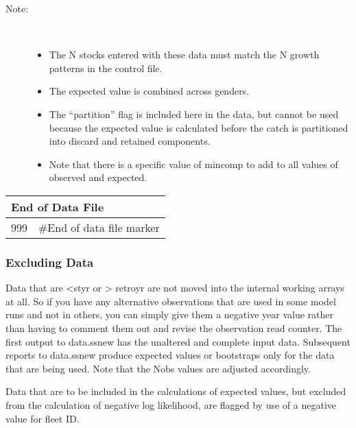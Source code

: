 \begin{description}
	\item[Note:]\
	\begin{itemize}
		\item The N stocks entered with these data must match the N growth patterns in the control file.
		\item The expected value is combined across genders.
		\item The “partition” flag is included here in the data, but cannot be used because the expected value is calculated before the catch is partitioned into discard and retained components.
		\item Note that there is a specific value of mincomp to add to all values of observed and expected.
	\end{itemize}
\end{description}

\begin{tabular}{p{2cm} p{13cm}}
	\multicolumn{2}{l}{End of Data File}\\
	\hline
	999 & \#End of data file marker\\
	\hline
\end{tabular}

\subsubsection{Excluding Data}
Data that are <styr or > retroyr are not moved into the internal working arrays at all.  So if you have any alternative observations that are used in some model runs and not in others, you can simply give them a negative year value rather than having to comment them out and revise the observation read counter. The first output to data.ss\textunderscore new has the unaltered and complete input data.  Subsequent reports to data.ss\textunderscore new produce expected values or bootstraps only for the data that are being used.  Note that the Nobs values are adjusted accordingly.

Data that are to be included in the calculations of expected values, but excluded from the calculation of negative log likelihood, are flagged by use of a negative value for fleet ID.

